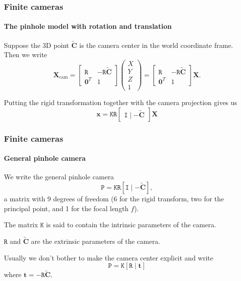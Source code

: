 \documentclass[aspectratio=169]{beamer}
\renewcommand{\vec}[1]{\boldsymbol{#1}}
\newcommand{\mat}[1]{\mathtt{#1}}
\begin{document}
\begin{frame}
\frametitle{Finite cameras}
\framesubtitle{The pinhole model with rotation and translation}

Suppose the 3D point $\tilde{\vec{C}}$ is the camera center in the
world coordinate frame.  Then we write
\begin{equation*}
\vec{X}_{\text{cam}} = \begin{bmatrix} \mat{R} & -\mat{R}\tilde{\vec{C}}
\\ \vec{0}^T & 1 \end{bmatrix} \begin{pmatrix} X \\ Y \\ Z \\ 1
\end{pmatrix} = \begin{bmatrix} \mat{R} & -\mat{R}\tilde{\vec{C}} \\
\vec{0}^T & 1 \end{bmatrix} \vec{X}.
\end{equation*}

\medskip

Putting the rigid transformation together with the camera projection
gives us
\begin{equation*}
\vec{x} = \mat{K}\mat{R}\begin{bmatrix} \mat{I} \mid -\tilde{\vec{C}}
\end{bmatrix} \vec{X}
\end{equation*}

\end{frame}

\begin{frame}
\frametitle{Finite cameras}
\framesubtitle{General pinhole camera}

We write the \alert{general pinhole camera}
\begin{equation*}
\mat{P}=\mat{K}\mat{R}[\mat{I}\mid -\tilde{\vec{C}}],
\end{equation*}
a matrix with 9 degrees of freedom (6 for the rigid transform, two for
the principal point, and 1 for the \alert{focal length} $f$).

\medskip

The matrix $\mat{K}$ is said to contain the \alert{intrinsic
  parameters} of the camera.

\medskip

$\mat{R}$ and $\tilde{\vec{C}}$ are the \alert{extrinsic parameters}
of the camera.

\medskip

Usually we don't bother to make the camera center explicit and write
\begin{equation*}
\mat{P}=\mat{K}[\mat{R}\mid \vec{t}]
\end{equation*}
where $\vec{t}=-\mat{R}\tilde{\vec{C}}$.

\end{frame}
\end{document}
